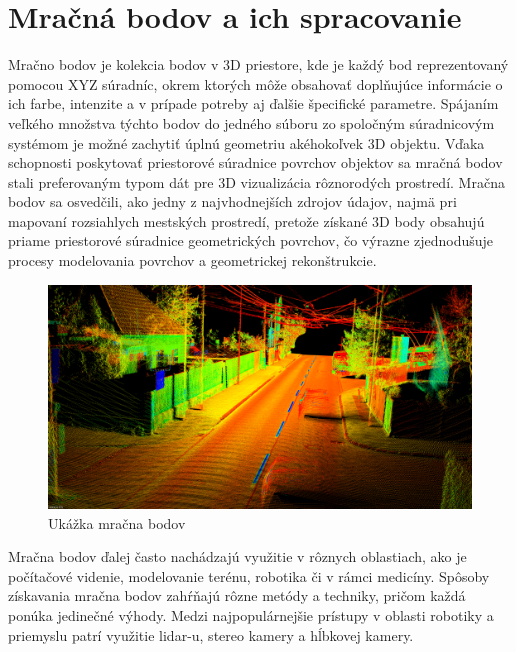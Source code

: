 \section{Mračná bodov a ich spracovanie}
\noindent Mračno bodov je kolekcia bodov v 3D priestore, kde je každý bod reprezentovaný pomocou XYZ súradníc, okrem ktorých môže  obsahovať doplňujúce informácie o ich farbe, intenzite a v prípade potreby aj ďalšie špecifické parametre. Spájaním veľkého množstva týchto bodov do jedného súboru zo spoločným súradnicovým systémom je možné zachytiť úplnú geometriu akéhokoľvek 3D objektu. Vďaka schopnosti poskytovať priestorové súradnice povrchov objektov sa mračná bodov stali preferovaným typom dát pre 3D vizualizácia rôznorodých prostredí. Mračna bodov sa osvedčili, ako jedny z najvhodnejších zdrojov údajov, najmä pri mapovaní rozsiahlych mestských prostredí, pretože získané 3D body obsahujú priame priestorové súradnice geometrických povrchov, čo výrazne zjednodušuje procesy modelovania povrchov a geometrickej rekonštrukcie. \cite{voxel_grid} 
\newline\begin{figure}[!htbp]
  \centering
  \includegraphics[width=16cm]{img/ukazka_pc.png}
  \caption{Ukážka mračna bodov}
  \label{vzhladobr}
\end{figure}	
\newline\indent Mračna bodov ďalej často nachádzajú využitie v rôznych oblastiach, ako je počítačové videnie, modelovanie terénu, robotika či v rámci medicíny. Spôsoby získavania mračna bodov zahŕňajú rôzne metódy a techniky, pričom každá ponúka jedinečné výhody. Medzi najpopulárnejšie prístupy v oblasti robotiky a priemyslu patrí využitie \acrshort{lidar}-u, stereo kamery a hĺbkovej kamery.

